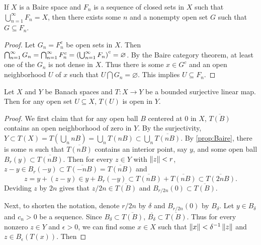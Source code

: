 \begin{proposition}\label{prop:Baire}
    If $X$ is a Baire space and $F_n$ is a sequence of closed sets in $X$ such that 
    $\bigcup_{n=1}^\infty F_n = X$, then there exists some $n$ and a nonempty open 
    set $G$ such that $G \subseteq F_n$.
\end{proposition}
\begin{proof}
    Let $G_n = F_n^c$ be open sets in $X$. Then $\bigcap_{n=1}^\infty G_n 
    = \bigcap_{n=1}^\infty F_n^c = \pth{\bigcup_{n=1}^\infty F_n}^c = \varnothing$. 
    By the Baire category theorem, at least one of the $G_n$ is not dense in $X$. 
    Thus there is some $x\in G^c$ and an open neighborhood $U$ of $x$ such that 
    $U\bigcap G_n = \varnothing$. This implies $U\subseteq F_n$.
\end{proof}

\begin{theorem}
    Let $X$ and $Y$ be Banach spaces and $T:X\to Y$ be a bounded surjective linear 
    map. Then for any open set $U\subseteq X$, $T(U)$ is open in $Y$.
\end{theorem}
\begin{proof}
    We first claim that for any open ball $B$ centered at $0$ in $X$, $\overline{T(B)}$ 
    contains an open neighborhood of zero in $Y$. By the surjectivity, $Y\subset T(X) 
    = T(\bigcup_n nB) = \bigcup_n T(nB)\subset \bigcup_n \overline{T(nB)}$. By 
    \cref{prop:Baire}, there is some $n$ such that $\overline{T(nB)}$ contains an 
    interior point, say $y$, and some open ball $B_r(y)\subset \overline{T(nB)}$. 
    Then for every $z\in Y$ with $\left\lVert {z} \right\rVert<r$, $z-y\in B_r(-y)\subset \overline{T(-nB)} 
    = \overline{T(nB)}$ and
    \begin{equation*}
        z = y + (z-y) \in y + B_r(-y) \subset \overline{T(nB)} + \overline{T(nB)} 
        \subset \overline{T(2nB)}.
    \end{equation*}
    Deviding $z$ by $2n$ gives that $z/2n\in \overline{T(B)}$ and $B_{r/2n}(0)\subset
    \overline{T(B)}$. 

    Next, to shorten the notation, denote $r/2n$ by $\delta$ and $B_{r/2n}(0)$ 
    by $B_\delta$. Let $y\in B_\delta$ and $c_n>0$ be a sequence. Since $B_\delta
    \subset \overline{T(B)}$, $\overline{B_\delta}\subset \overline{T(B)}$. Thus 
    for every nonzero $z\in Y$ and $\epsilon>0$, we can find some $x\in X$ such that 
    $\left\lVert {x} \right\rVert<\delta^{-1}\left\lVert {z} \right\rVert$ and $z\in B_\epsilon(T(x))$. Then 
\end{proof}

